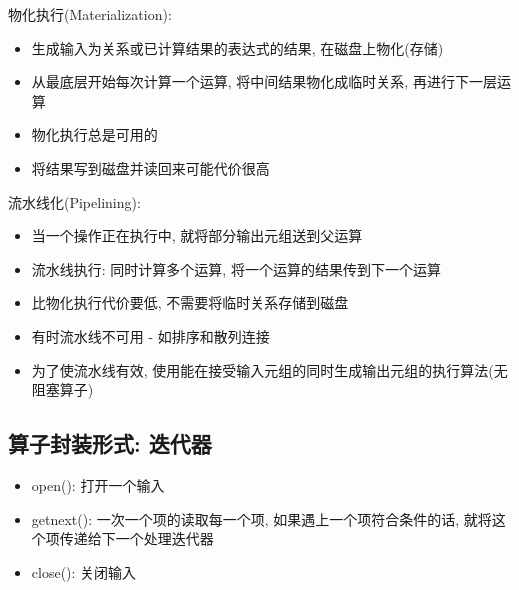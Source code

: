 \begin{definition}
    物化执行(Materialization):
    \begin{itemize}
        \item 生成输入为关系或已计算结果的表达式的结果, 在磁盘上物化(存储)
        \item 从最底层开始每次计算一个运算, 将中间结果物化成临时关系, 再进行下一层运算
        \item 物化执行总是可用的
        \item 将结果写到磁盘并读回来可能代价很高
    \end{itemize}
\end{definition}

\begin{definition}
    流水线化(Pipelining):
    \begin{itemize}
        \item 当一个操作正在执行中, 就将部分输出元组送到父运算
        \item 流水线执行: 同时计算多个运算, 将一个运算的结果传到下一个运算
        \item 比物化执行代价要低, 不需要将临时关系存储到磁盘
        \item 有时流水线不可用 - 如排序和散列连接
        \item 为了使流水线有效, 使用能在接受输入元组的同时生成输出元组的执行算法(无阻塞算子)
    \end{itemize}
\end{definition}

\subsection{算子封装形式: 迭代器}

\begin{itemize}
    \item open(): 打开一个输入
    \item getnext(): 一次一个项的读取每一个项, 如果遇上一个项符合条件的话, 就将这个项传递给下一个处理迭代器
    \item close(): 关闭输入
\end{itemize}